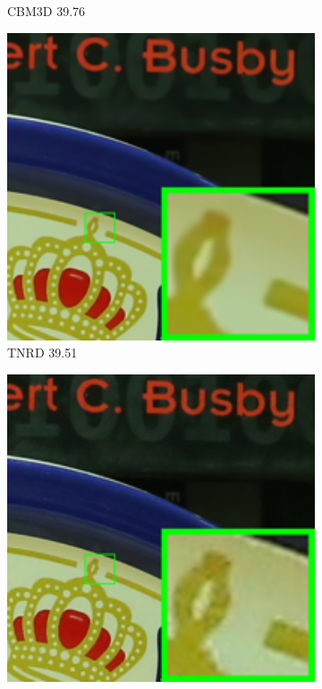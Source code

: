 \begin{figure}
\begin{subfigure}[t]{0.19\textwidth}
		\caption{CBM3D 39.76}
    \end{subfigure}
    \hfill
    \begin{subfigure}[t]{0.19\textwidth}
        \centering
        \includegraphics[width=1\textwidth]{images/mcwnnm/cc/resize_br_TRD_CC15_5dmark3_iso3200_1.png}
\caption{TNRD 39.51}
    \end{subfigure}
    \hfill
    \begin{subfigure}[t]{0.19\textwidth}
        \centering
        \includegraphics[width=1\textwidth]{images/mcwnnm/cc/resize_br_NI_CC15_5dmark3_iso3200_1.png}

\end{subfigure}
\end{figure}
